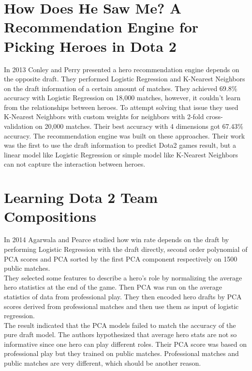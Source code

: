 \documentclass[12pt,openany,a4paper]{book}
\begin{document}
\section{How Does He Saw Me?
A Recommendation Engine for Picking Heroes in
Dota 2}

In 2013 Conley and Perry\cite{conley2013does} presented a hero recommendation engine depends on the opposite draft. They performed Logistic Regression and K-Nearest Neighbors on the draft information of a certain amount of matches. They achieved 69.8\% accuracy with Logistic Regression on 18,000 matches, however, it couldn't learn from the relationships between heroes. To attempt solving that issue they used K-Nearest Neighbors with custom weights for neighbors with 2-fold cross-validation on 20,000 matches. Their best accuracy with 4 dimensions got 67.43\% accuracy. The recommendation engine was built on these approaches. Their work was the first to use the draft information to predict Dota2 games result, but a linear model like Logistic Regression or simple model like K-Nearest Neighbors can not capture the interaction between heroes.\\

\section{Learning Dota 2 Team Compositions}

In 2014 Agarwala and Pearce \cite{agarwala2014learning} studied how win rate depends on the draft by performing Logistic Regression with the draft directly, second order polynomial of PCA scores and PCA sorted by the first PCA component respectively on 1500 public matches. \\

They selected some features to describe a hero's role by normalizing the average hero statistics at the end of the game. Then PCA was run on the average statistics of data from professional play. They then encoded hero drafts by PCA scores derived from professional matches and then use them as input of logistic regression.\\

The result indicated that the PCA models failed to match the accuracy of the pure draft model. The authors hypothesized that average hero stats are not so informative since one hero can play different roles. Their PCA score was based on professional play but they trained on public matches. Professional matches and public matches are very different, which should be another reason.\\
\end{document}
